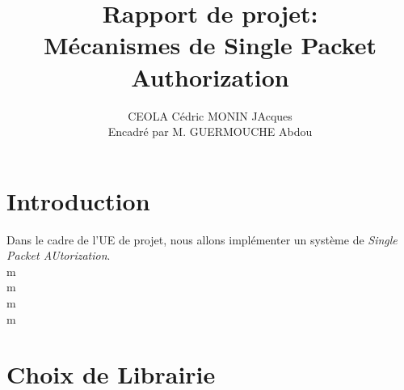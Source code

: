 \documentclass[12pt]{article}
\title{Rapport de projet:\\
Mécanismes de Single Packet Authorization}
\author{CEOLA Cédric MONIN JAcques\\
Encadré par M. GUERMOUCHE Abdou}
\begin{document}
\maketitle

\clearpage                  
\tableofcontents
\clearpage

\section{Introduction}

Dans le cadre de l'UE de projet, nous allons implémenter un système de \emph{Single Packet AUtorization}.\\
m\\
m\\
m\\
m\\
\section{Choix de Librairie}
\end{document}
